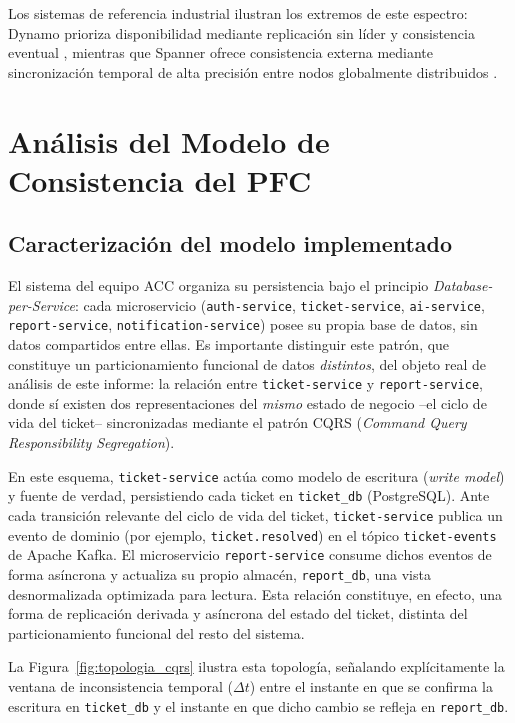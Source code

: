 \documentclass[12pt, a4paper]{article}
\begin{document}
Los sistemas de referencia industrial ilustran los extremos de este espectro: Dynamo prioriza disponibilidad mediante replicación sin líder y consistencia eventual \cite{decandia2007}, mientras que Spanner ofrece consistencia externa mediante sincronización temporal de alta precisión entre nodos globalmente distribuidos \cite{corbett2013}.

\section{Análisis del Modelo de Consistencia del PFC}

\subsection{Caracterización del modelo implementado}
El sistema del equipo ACC organiza su persistencia bajo el principio \textit{Database-per-Service}: cada microservicio (\texttt{auth-service}, \texttt{ticket-service}, \texttt{ai-service}, \texttt{report-service}, \texttt{notification-service}) posee su propia base de datos, sin datos compartidos entre ellas. Es importante distinguir este patrón, que constituye un particionamiento funcional de datos \emph{distintos}, del objeto real de análisis de este informe: la relación entre \texttt{ticket-service} y \texttt{report-service}, donde sí existen dos representaciones del \emph{mismo} estado de negocio --el ciclo de vida del ticket-- sincronizadas mediante el patrón CQRS (\textit{Command Query Responsibility Segregation}).

En este esquema, \texttt{ticket-service} actúa como modelo de escritura (\textit{write model}) y fuente de verdad, persistiendo cada ticket en \texttt{ticket\_db} (PostgreSQL). Ante cada transición relevante del ciclo de vida del ticket, \texttt{ticket-service} publica un evento de dominio (por ejemplo, \texttt{ticket.resolved}) en el tópico \texttt{ticket-events} de Apache Kafka. El microservicio \texttt{report-service} consume dichos eventos de forma asíncrona y actualiza su propio almacén, \texttt{report\_db}, una vista desnormalizada optimizada para lectura. Esta relación constituye, en efecto, una forma de replicación derivada y asíncrona del estado del ticket, distinta del particionamiento funcional del resto del sistema.

\newpage
La Figura~\ref{fig:topologia_cqrs} ilustra esta topología, señalando explícitamente la ventana de inconsistencia temporal (\(\Delta t\)) entre el instante en que se confirma la escritura en \texttt{ticket\_db} y el instante en que dicho cambio se refleja en \texttt{report\_db}.
\end{document}
